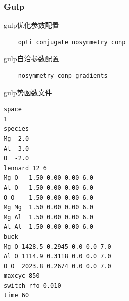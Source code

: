\documentclass[12pt]{article}
\begin{document}
\subsubsection{Gulp}
\begin{tcolorbox}[enhanced, breakable, title = {goption.relax}]
gulp优化参数配置
\tcblower
\begin{verbatim}                                
    opti conjugate nosymmetry conp
\end{verbatim}
\end{tcolorbox}
\begin{tcolorbox}[enhanced, breakable, title = {goption.scf}]
gulp自洽参数配置
\tcblower
\begin{verbatim}                                
    nosymmetry conp gradients
\end{verbatim}
\end{tcolorbox}
\begin{tcolorbox}[enhanced, breakable, title = {goption.scf}]
gulp势函数文件
\tcblower
\begin{verbatim}                                
space                                                                                                         
1
species
Mg  2.0 
Al  3.0 
O  -2.0
lennard 12 6
Mg O   1.50 0.00 0.00 6.0 
Al O   1.50 0.00 0.00 6.0 
O O    1.50 0.00 0.00 6.0 
Mg Mg  1.50 0.00 0.00 6.0 
Mg Al  1.50 0.00 0.00 6.0 
Al Al  1.50 0.00 0.00 6.0 
buck
Mg O 1428.5 0.2945 0.0 0.0 7.0 
Al O 1114.9 0.3118 0.0 0.0 7.0 
O O  2023.8 0.2674 0.0 0.0 7.0 
maxcyc 850 
switch rfo 0.010
time 60
\end{verbatim}
\end{tcolorbox}
\end{document}
